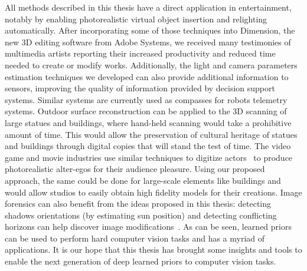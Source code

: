 All methods described in this thesis have a direct application in entertainment, notably by enabling photorealistic virtual object insertion and relighting automatically. After incorporating some of those techniques into Dimension, the new 3D editing software from Adobe Systems, we received many testimonies of multimedia artists reporting their increased productivity and reduced time needed to create or modify works. Additionally, the light and camera parameters estimation techniques we developed can also provide additional information to sensors, improving the quality of information provided by decision support systems. Similar systems are currently used as compasses for robots telemetry systems\cite{Ma2017}. Outdoor surface reconstruction can be applied to the 3D scanning of large statues and buildings, where hand-held scanning would take a prohibitive amount of time. This would allow the preservation of cultural heritage of statues and buildings through digital copies that will stand the test of time. The video game and movie industries use similar techniques to digitize actors~\cite{debevec2000acquiring} to produce photorealistic alter-egos for their audience pleasure. Using our proposed approach, the same could be done for large-scale elements like buildings and would allow studios to easily obtain high fidelity models for their creations. Image forensics can also benefit from the ideas proposed in this thesis: detecting shadows orientations (by estimating sun position) and detecting conflicting horizons can help discover image modifications~\cite{Farid2010}. As can be seen, learned priors can be used to perform hard computer vision tasks and has a myriad of applications. It is our hope that this thesis has brought some insights and tools to enable the next generation of deep learned priors to computer vision tasks. 
